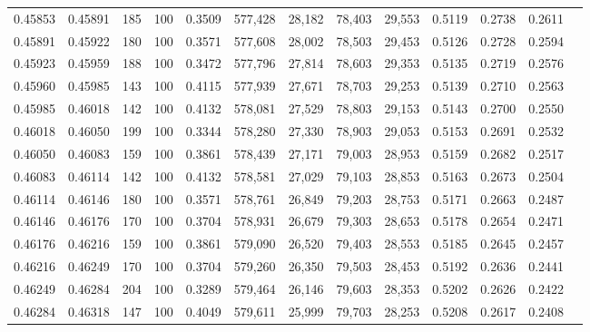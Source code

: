 \begin{tabular}{rrrrrrrrrrrrr}
0.45853 & 0.45891 &    185 & 100 &                                     0.3509 & 577,428 &  28,182 &  78,403 &  29,553 & 0.5119 & 0.2738 & 0.2611 \\
0.45891 & 0.45922 &    180 & 100 &                                     0.3571 & 577,608 &  28,002 &  78,503 &  29,453 & 0.5126 & 0.2728 & 0.2594 \\
0.45923 & 0.45959 &    188 & 100 &                                     0.3472 & 577,796 &  27,814 &  78,603 &  29,353 & 0.5135 & 0.2719 & 0.2576 \\
0.45960 & 0.45985 &    143 & 100 &                                     0.4115 & 577,939 &  27,671 &  78,703 &  29,253 & 0.5139 & 0.2710 & 0.2563 \\
0.45985 & 0.46018 &    142 & 100 &                                     0.4132 & 578,081 &  27,529 &  78,803 &  29,153 & 0.5143 & 0.2700 & 0.2550 \\
0.46018 & 0.46050 &    199 & 100 &                                     0.3344 & 578,280 &  27,330 &  78,903 &  29,053 & 0.5153 & 0.2691 & 0.2532 \\
0.46050 & 0.46083 &    159 & 100 &                                     0.3861 & 578,439 &  27,171 &  79,003 &  28,953 & 0.5159 & 0.2682 & 0.2517 \\
0.46083 & 0.46114 &    142 & 100 &                                     0.4132 & 578,581 &  27,029 &  79,103 &  28,853 & 0.5163 & 0.2673 & 0.2504 \\
0.46114 & 0.46146 &    180 & 100 &                                     0.3571 & 578,761 &  26,849 &  79,203 &  28,753 & 0.5171 & 0.2663 & 0.2487 \\
0.46146 & 0.46176 &    170 & 100 &                                     0.3704 & 578,931 &  26,679 &  79,303 &  28,653 & 0.5178 & 0.2654 & 0.2471 \\
0.46176 & 0.46216 &    159 & 100 &                                     0.3861 & 579,090 &  26,520 &  79,403 &  28,553 & 0.5185 & 0.2645 & 0.2457 \\
0.46216 & 0.46249 &    170 & 100 &                                     0.3704 & 579,260 &  26,350 &  79,503 &  28,453 & 0.5192 & 0.2636 & 0.2441 \\
0.46249 & 0.46284 &    204 & 100 &                                     0.3289 & 579,464 &  26,146 &  79,603 &  28,353 & 0.5202 & 0.2626 & 0.2422 \\
0.46284 & 0.46318 &    147 & 100 &                                     0.4049 & 579,611 &  25,999 &  79,703 &  28,253 & 0.5208 & 0.2617 & 0.2408 \\

\end{tabular}
